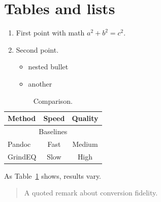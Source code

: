 \documentclass{article}
\begin{document}
\section{Tables and lists}

\begin{enumerate}
\item First point with math $a^2 + b^2 = c^2$.
\item Second point.
  \begin{itemize}
  \item nested bullet
  \item another
  \end{itemize}
\end{enumerate}

\begin{table}
\begin{tabular}{lcc}
\toprule
Method & Speed & Quality \\
\midrule
\multicolumn{3}{c}{Baselines} \\
Pandoc & Fast & Medium \\
GrindEQ & Slow & High \\
\bottomrule
\end{tabular}
\caption{Comparison.}\label{tab:cmp}
\end{table}

As Table~\ref{tab:cmp} shows, results vary.

\begin{quote}
A quoted remark about conversion fidelity.
\end{quote}
\end{document}
